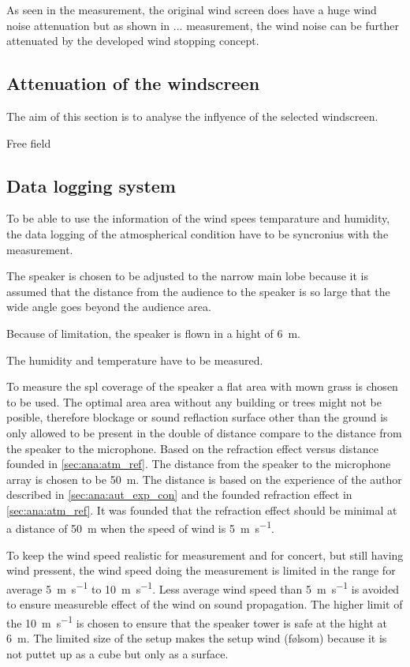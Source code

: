 As seen in the measurement, the original wind screen does have a huge wind noise attenuation but as shown in ... measurement, the wind noise can be further attenuated by the developed wind stopping concept. 




\subsection{Attenuation of the windscreen} 
The aim of this section is to analyse the inflyence of the selected windscreen. 

Free field 



\subsection{Data logging system} 

To be able to use the information of the wind spees temparature and humidity, the data logging of the atmospherical condition have to be syncronius with the measurement. 




The speaker is chosen to be adjusted to the narrow main lobe because it is assumed that the distance from the audience to the speaker is so large that the wide angle goes beyond the audience area.

Because of limitation, the speaker is flown in a hight of \SI{6}{\meter}. 

The humidity and temperature have to be measured.

To measure the \gls{spl} coverage of the speaker a flat area with mown grass is chosen to be used. The optimal area area without any building or trees might not be posible, therefore blockage or sound reflaction surface other than the ground is only allowed to be present in the double of distance compare to the distance from the speaker to the microphone. Based on the refraction effect versus distance founded in \autoref{sec:ana:atm_ref}. The distance from the speaker to the microphone array is chosen to be \SI{50}{\meter}. The distance is based on the experience of the author described in \autoref{sec:ana:aut_exp_con} and the founded refraction effect in \autoref{sec:ana:atm_ref}. It was founded that the refraction effect should be minimal at a distance of \SI{50}{\meter} when the speed of wind is \SI{5}{\meter\per\second}. 


To keep the wind speed realistic for measurement and for concert, but still having wind pressent, the wind speed doing the measurement is limited in the range for average \SI{5}{\meter\per\second} to \SI{10}{\meter\per\second}. Less average wind speed than \SI{5}{\meter\per\second} is avoided to ensure measureble effect of the wind on sound propagation. The higher limit of the \SI{10}{\meter\per\second} is chosen to ensure that the speaker tower is safe at the hight at \SI{6}{\meter}. The limited size of the setup makes the setup wind (følsom) because it is not puttet up as a cube but only as a surface. 


